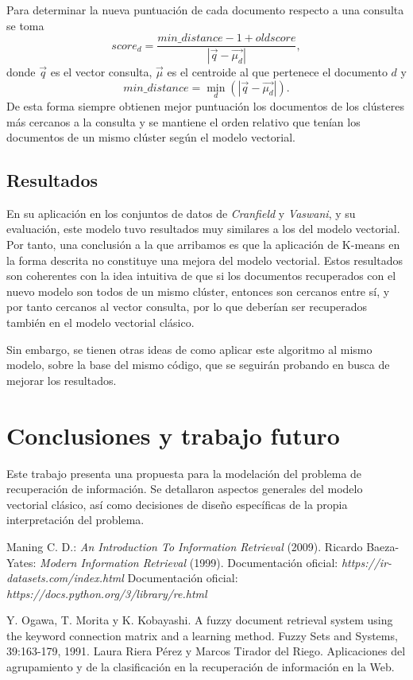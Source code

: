 \documentclass{llncs}
\begin{document}
	 Para determinar la nueva puntuaci\'on de cada documento respecto a una consulta se toma 
	 \[score_d =  \frac{min\_distance - 1 + oldscore}{|\overrightarrow{q} - \overrightarrow{\mu_d}|},\]
	 donde $\overrightarrow{q}$ es el vector consulta, $\overrightarrow{\mu}$ es el centroide al que pertenece el documento $d$ y
	 \[ min\_distance = \min_{d}(|\overrightarrow{q} - \overrightarrow{\mu_d}|).\]
	 De esta forma siempre obtienen mejor puntuaci\'on los documentos de los cl\'usteres m\'as cercanos a la consulta y se mantiene el orden relativo que ten\'ian los documentos de un mismo cl\'uster seg\'un el modelo vectorial.
	 
	 \subsection{Resultados}
	 
	 En su aplicaci\'on en los conjuntos de datos de \emph{Cranfield} y \emph{Vaswani}, y su evaluaci\'on, este modelo tuvo resultados muy similares a los del modelo vectorial. Por tanto, una conclusi\'on a la que arribamos es que la aplicaci\'on de K-means en la forma descrita no constituye una mejora del modelo vectorial. Estos resultados son coherentes con la idea intuitiva de que si los documentos recuperados con el nuevo modelo son todos de un mismo cl\'uster, entonces son cercanos entre s\'i, y por tanto cercanos al vector consulta, por lo que deber\'ian ser recuperados tambi\'en en el modelo vectorial cl\'asico.
	 
	 Sin embargo, se tienen otras ideas de como aplicar este algoritmo al mismo modelo, sobre la base del mismo c\'odigo, que se seguir\'an probando en busca de mejorar los resultados.
	 
	\section{Conclusiones y trabajo futuro}
	
	Este trabajo presenta una propuesta para la modelaci\'on del problema de recuperaci\'on de informaci\'on. Se detallaron aspectos generales del modelo vectorial cl\'asico, as\'i como decisiones de dise\~no espec\'ificas de la propia interpretaci\'on del problema. 
	
	\begin{thebibliography}{20}
		 Maning C. D.: \emph{An Introduction To Information Retrieval} (2009).
		 Ricardo Baeza-Yates: \emph{Modern Information Retrieval} (1999).
		 Documentaci\'on oficial: \emph{https://ir-datasets.com/index.html}
		 Documentaci\'on oficial: \emph{https://docs.python.org/3/library/re.html}
		
		 Y. Ogawa, T. Morita y K. Kobayashi. A fuzzy document retrieval system using the keyword connection matrix and a learning method. Fuzzy Sets and Systems, 39:163-179, 1991.		
		 Laura Riera P\'erez y Marcos Tirador del Riego. Aplicaciones del
		agrupamiento y de la clasificación en la recuperaci\'on	de informaci\'on en la Web.
	\end{thebibliography}
	
\end{document}

